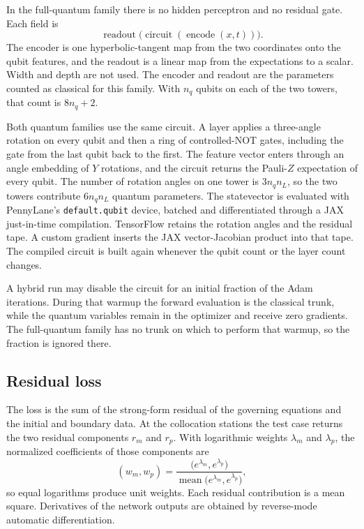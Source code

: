 \documentclass[11pt]{article}
\begin{document}
In the full-quantum family there is no hidden perceptron and no residual
gate. Each field is
\begin{equation}
\label{eq:fullq}
\operatorname{readout}\!\big(\operatorname{circuit}(\operatorname{encode}(x,t))\big).
\end{equation}
The encoder is one hyperbolic-tangent map from the two coordinates onto
the qubit features, and the readout is a linear map from the expectations
to a scalar. Width and depth are not used. The encoder and readout are
the parameters counted as classical for this family. With \(n_{q}\) qubits
on each of the two towers, that count is \(8n_{q}+2\).

Both quantum families use the same circuit. A layer applies a three-angle
rotation on every qubit and then a ring of controlled-NOT gates, including
the gate from the last qubit back to the first. The feature vector enters
through an angle embedding of \(Y\) rotations, and the circuit returns the
Pauli-\(Z\) expectation of every qubit. The number of rotation angles on
one tower is \(3n_{q}n_{L}\), so the two towers contribute
\(6n_{q}n_{L}\) quantum parameters. The statevector is evaluated with
PennyLane's \texttt{default.qubit} device, batched and differentiated
through a JAX just-in-time compilation. TensorFlow retains the rotation
angles and the residual tape. A custom gradient inserts the JAX
vector-Jacobian product into that tape. The compiled circuit is built
again whenever the qubit count or the layer count changes.

A hybrid run may disable the circuit for an initial fraction of the Adam
iterations. During that warmup the forward evaluation is the classical
trunk, while the quantum variables remain in the optimizer and receive
zero gradients. The full-quantum family has no trunk on which to perform
that warmup, so the fraction is ignored there.

\subsection{Residual loss}
\label{sec:loss}

The loss is the sum of the strong-form residual of the governing equations
and the initial and boundary data. At the collocation stations the test
case returns the two residual components \(r_{m}\) and \(r_{p}\). With
logarithmic weights \(\lambda_{m}\) and \(\lambda_{p}\), the normalized
coefficients of those components are
\begin{equation}
(w_{m},w_{p})
=
\frac{\big(e^{\lambda_{m}},e^{\lambda_{p}}\big)}
{\operatorname{mean}\big(e^{\lambda_{m}},e^{\lambda_{p}}\big)},
\end{equation}
so equal logarithms produce unit weights. Each residual contribution is a
mean square. Derivatives of the network outputs are obtained by
reverse-mode automatic differentiation.
\end{document}
